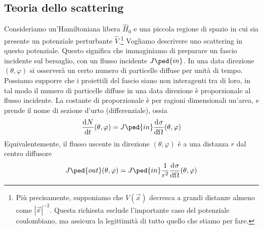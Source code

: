 \documentclass[a4paper, 11pt]{article}
\newcommand{\op}[1]{\hat{#1}}
\renewcommand{\op}[1]{\hat{#1}}
\newcommand{\ham}{\hat{H}}
\begin{document}
\subsection{Teoria dello scattering}
Consideriamo un'Hamiltoniana libera $\ham_0$ e una piccola regione di spazio in cui sia presente un potenziale perturbante $\op V$.\footnote{Più precisamente, supponiamo che $V(\vec{x})$ decresca a grandi distanze almeno come $|\vec{x}|^{-2}$. Questa richiesta esclude l'importante caso del potenziale coulombiano, ma assicura la legittimità di tutto quello che stiamo per fare.} Vogliamo descrivere uno scattering in questo potenziale. Questo significa che immaginiamo di preparare un fascio incidente sul bersaglio, con un flusso incidente $J\ped{in}$. In una data direzione $(\theta,\varphi)$ si osserverà un certo numero di particelle diffuse per unità di tempo. Possiamo supporre che i proiettili del fascio siano non interagenti tra di loro, in tal modo il numero di particelle diffuse in una data direzione è proporzionale al flusso incidente. La costante di proporzionale è per ragioni dimensionali un'area, e prende il nome di sezione d'urto (differenziale), ossia
\[\der{N}{t}(\theta,\varphi)=J\ped{in}\der{\sigma}{\Omega}(\theta,\varphi)\]
Equivalentemente, il flusso uscente in direzione $(\theta,\varphi)$ è a una distanza $r$ dal centro diffusore
\[J\ped{out}(\theta,\varphi)=J\ped{in}\frac{1}{r^2}\der{\sigma}{\Omega}(\theta,\varphi)\]
\end{document}
